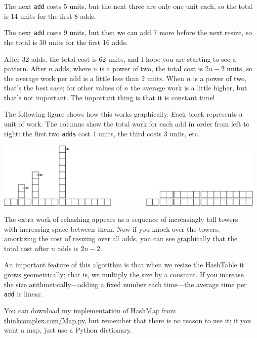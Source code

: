 \documentclass[10pt]{book}
\begin{document}
The next {\tt add} costs 5 units, but the next three
are only one unit each, so the total is 14 units for the
first 8 adds.

The next {\tt add} costs 9 units, but then we can add 7 more
before the next resize, so the total is 30 units for the
first 16 adds.

After 32 adds, the total cost is 62 units, and I hope you are starting
to see a pattern.  After $n$ adds, where $n$ is a power of two, the
total cost is $2n - 2$ units, so the average work per add is
a little less than 2 units.  When $n$ is a power of two, that's
the best case; for other values of $n$ the average work is a little
higher, but that's not important.  The important thing is that it
is constant time!

The following figure shows how this works graphically.  Each
block represents a unit of work.  The columns show the total
work for each add in order from left to right: the first two
{\tt adds} cost 1 units, the third costs 3 units, etc.

\beforefig
\centerline{\includegraphics[width=5.5in]{figs/towers.eps}}
\afterfig

The extra work of rehashing appears as a sequence of increasingly
tall towers with increasing space between them.  Now if you knock
over the towers, amortizing the cost of resizing over all
adds, you can see graphically that the total cost after $n$
adds is $2n - 2$.

An important feature of this algorithm is that when we resize the
HashTable it grows geometrically; that is, we multiply the size by a
constant.  If you increase the size
arithmetically---adding a fixed number each time---the average time
per {\tt add} is linear.

You can download my implementation of HashMap from
\url{thinkcomplex.com/Map.py}, but remember that there 
is no reason to use it; if you want a map, just use a Python dictionary.
\end{document}
